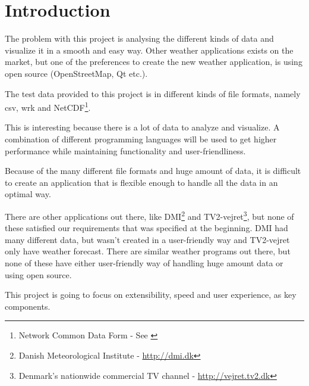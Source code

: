 \chapter{Introduction}
\label{sec:introduction}



The problem with this project is analysing the different kinds of data and visualize it in a smooth and easy way. Other weather applications exists on the market, but one of the preferences to create the new weather application, is using open source (OpenStreetMap, Qt etc.). 

The test data provided to this project is in different kinds of file formats, namely csv, wrk and NetCDF\footnote{Network Common Data Form - See \cite{netcdf}}.

This is interesting because there is a lot of data to analyze and visualize. A combination of different programming languages will be used to get higher performance while maintaining functionality and user-friendliness.

Because of the many different file formats and huge amount of data, it is difficult to create an application that is flexible enough to handle all the data in an optimal way.

There are other applications out there, like DMI\footnote{Danish Meteorological Institute - \url{http://dmi.dk}} and TV2-vejret\footnote{Denmark's nationwide commercial TV channel - \url{http://vejret.tv2.dk}}, but none of these satisfied our requirements that was specified at the beginning. DMI had many different data, but wasn't created in a user-friendly way and TV2-vejret only have weather forecast. There are similar weather programs out there, but none of these have either user-friendly way of handling huge amount data or using open source.

This project is going to focus on extensibility, speed and user experience, as key components.

